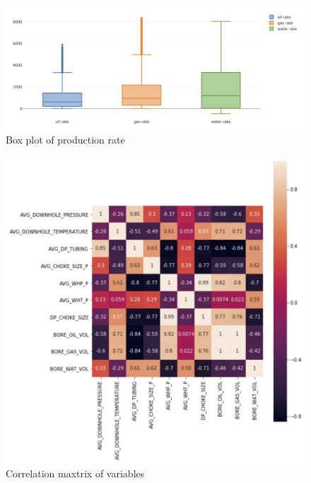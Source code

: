 \documentclass[12pt,a4paper]{report}
\begin{document}
\begin{figure}[H]
  \centering
  \includegraphics[width=\linewidth]{Preprocessing/boxplot}
  \caption{Box plot of production rate}
\end{figure}

\begin{figure}[H]
  \centering
  \includegraphics[width=\linewidth]{Preprocessing/corr1}
  \caption{Correlation maxtrix of variables}
\end{figure}
\end{document}
